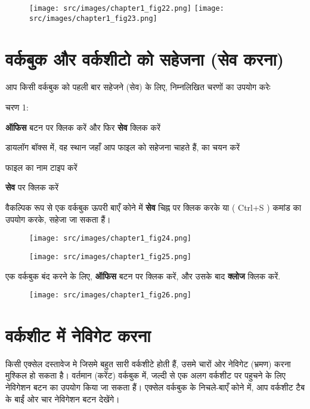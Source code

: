 \begin{figure}[t]
\centering
\texttt{[image: src/images/chapter1\_fig22.png]}\qquad
\texttt{[image: src/images/chapter1\_fig23.png]}
\end{figure}

\section{वर्कबुक और वर्कशीटो को सहेजना (सेव करना)}\label{id-1.13}

आप किसी वर्कबुक को पहली बार सहेजने (सेव) के लिए, निम्नलिखित चरणों का उपयोग करेः
\begin{descriptionSimple}{चरण 1:}
\item[चरण 1] \textbf{ऑफिस} बटन पर क्लिक करें और फिर \textbf{सेव} क्लिक करें
\item[चरण 2] डायलॉग बॉक्स में, वह स्थान जहाँ आप फाइल को सहेजना चाहते हैं, का चयन करें
\item[चरण 3] फाइल का नाम टाइप करें
\item[चरण 4] \textbf{सेव} पर क्लिक करें
\end{descriptionSimple}

वैकल्पिक रूप से एक वर्कबुक ऊपरी बाएँ कोने में \textbf{सेव} चिह्न पर क्लिक करके या ( {\rm Ctrl+S} ) कमांड का उपयोग करके, सहेजा जा सकता हैं।

\begin{figure}[H]
\centering
\texttt{[image: src/images/chapter1\_fig24.png]}
\end{figure}
\begin{figure}[H]
\centering
\texttt{[image: src/images/chapter1\_fig25.png]}
\end{figure}

एक वर्कबुक बंद करने के लिए, \textbf{ऑफिस} बटन पर क्लिक करें, और उसके बाद \textbf{क्लोज} क्लिक करें.				

\begin{figure}[H]
\centering
\texttt{[image: src/images/chapter1\_fig26.png]}
\end{figure}				

\section{वर्कशीट में नेविगेट करना}\label{id-1.14}

किसी एक्सेल दस्तावेज मे जिसमे बहुत सारी वर्कशीटे होती हैं, उसमे चारों ओर नेविगेट (भ्रमण) करना मुश्किल हो सकता है। वर्तमान (करेंट) वर्कबुक में, जल्दी से एक अलग वर्कशीट पर पहुचने के लिए नेविगेशन बटन का उपयोग किया जा सकता हैं। एक्सेल वर्कबुक के निचले-बाएँ कोने में, आप वर्कशीट टैब के बाईं ओर चार नेविगेशन बटन देखेंगे।

